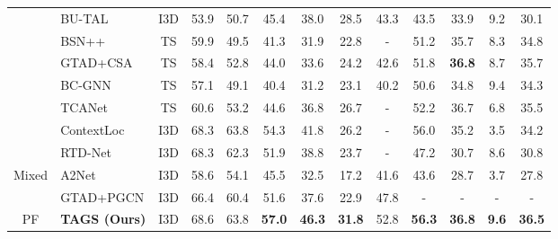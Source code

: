 \documentclass[runningheads]{llncs}
\newcommand{\shortmodelname}{TAGS}
\begin{document}
\begin{table*}[t]
{{\begin{tabular}{@{}c|l|c|cccccc|cccc@{}}
                              & BU-TAL      & I3D & 53.9 & 50.7 & 45.4 & 38.0 & {28.5} & 43.3 & 43.5          & 33.9          & 9.2  & 30.1          \\ \cmidrule(l){4-13} 
                              & BSN++      & TS  & 59.9 & 49.5  & 41.3  & 31.9  & 22.8 & - &  51.2           & 35.7          & 8.3   & 34.8          \\ \cmidrule(l){4-13}
                              & GTAD+CSA      & TS  & 58.4  & 52.8 & 44.0 & 33.6 & 24.2 & 42.6 & 51.8           & \bf 36.8          & 8.7  & 35.7          \\ \cmidrule(l){4-13}
                    
                              & BC-GNN      & TS  & 57.1 & 49.1 & 40.4 & 31.2 & 23.1 & 40.2 & 50.6          & 34.8          & 9.4  & 34.3          \\
                              \cmidrule(l){4-13} 
                              & TCANet      & TS  & 60.6 & 53.2 & 44.6 & 36.8 & 26.7 & -    & 52.2          & 36.7 & 6.8  & 35.5          \\
                              \cmidrule(l){4-13}
                              & ContextLoc     & I3D  & 68.3 & 63.8 & 54.3 & 41.8 & 26.2 & -    & 56.0         & 35.2  & 3.5  & 34.2          \\
                              \cmidrule(l){4-13}
                              \cmidrule(l){4-13}
                              & RTD-Net         & I3D & 68.3 & 62.3 & 51.9 & 38.8 & 23.7 & -   & 47.2          & 30.7          & 8.6  & 30.8          \\  
                              
                              \midrule
\multirow{2}{*}{Mixed}        & A2Net      & I3D & 58.6 & 54.1 & 45.5 & 32.5 & 17.2 & 41.6 & 43.6          & 28.7          & 3.7  & 27.8          \\ \cmidrule(l){4-13} 
                              & GTAD+PGCN  & I3D & 66.4 & 60.4 & 51.6 & 37.6 & 22.9 & 47.8 & -             & -             & -    & -             \\ \midrule
\multirow{3}{*}{ PF}  
                            
                            &\bf {\shortmodelname} (Ours) & I3D & 68.6   & 63.8   & \bf 57.0   & \bf 46.3   & \textbf{31.8}   & 52.8  
                              & \textbf{56.3} & \bf 36.8 &\bf \textbf{9.6}  & \textbf{36.5} \\
                            

\end{tabular}}}
\end{table*}
\end{document}
